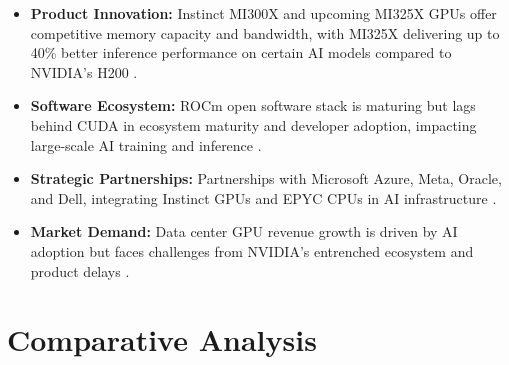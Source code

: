 \documentclass{article}
\begin{document}
\begin{itemize}
    \item \textbf{Product Innovation:} Instinct MI300X and upcoming MI325X GPUs offer competitive memory capacity and bandwidth, with MI325X delivering up to 40\% better inference performance on certain AI models compared to NVIDIA's H200 \cite{amd_press2024, kavout2024}.
    \item \textbf{Software Ecosystem:} ROCm open software stack is maturing but lags behind CUDA in ecosystem maturity and developer adoption, impacting large-scale AI training and inference \cite{ainvest2024}.
    \item \textbf{Strategic Partnerships:} Partnerships with Microsoft Azure, Meta, Oracle, and Dell, integrating Instinct GPUs and EPYC CPUs in AI infrastructure \cite{amd_insights2024}.
    \item \textbf{Market Demand:} Data center GPU revenue growth is driven by AI adoption but faces challenges from NVIDIA's entrenched ecosystem and product delays \cite{crn2025}.
\end{itemize}

\section{Comparative Analysis}
\end{document}
